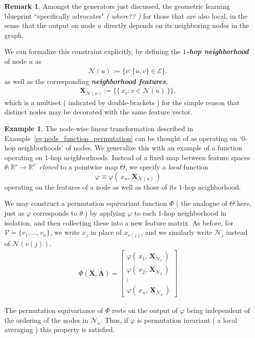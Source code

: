 \documentclass[12pt]{article}
\numberwithin{equation}{section}
\theoremstyle{definition}
\newtheorem{rmk}[thm]{Remark}
\newtheorem{eg}{Example}
\newcommand{		\eq		}[1]	{	\begin{align*}#1\end{align*}	}%
\newcommand{		\B		}	{\textbf					} %
\newcommand{		\1		}	{	\bm{1}					}%
\begin{document}
\begin{rmk}
Amongst the generators just discussed, the geometric learning blueprint ``specifically advocates" \emph{( where?? )} for those that are also local, in the sense that the output on node $u$ directly depends on its neighboring nodes in the graph. 
\end{rmk}

We can formalize this constraint explicitly, by defining the \emph{\B{$1$-hop neighborhood}} of node $u$ as
\eq{
\mathcal{N}(u) := \{ v : \{ u,v \} \in \mathcal{E} \} ,
}
as well as the corresponding \emph{\B{neighborhood features}}, 
\eq{
\bm{X}_{\mathcal{N}(u)} := \{ \{ \, x_v : v \in \mathcal{N}(u) \, \} \} ,
}
which is a multiset ( indicated by double-brackets ) for the simple reason that distinct nodes may be decorated with the same feature vector. 



\vspace{5mm}

\begin{mdframed}
\begin{eg}

The node-wise linear transformation described in Example~\ref{eg:node_function_permutation} can be thought of as operating on `$0$-hop neighborhoods' of nodes. We generalize this with an example of a function operating on $1$-hop neighborhoods. Instead of a fixed map between feature spaces $\theta : \mathbb{R}^s \to \mathbb{R}^{s'}$ \emph{cloned} to a pointwise map $\Theta$, we specify a \emph{local} function 
	$$
	\varphi \equiv \varphi( \, x_u, \, \bm{X}_{\mathcal{N}(u)} \, )
	$$ 
	operating on the features of a node as well as those of its $1$-hop neighborhood. 
	
We may construct a permutation equivariant function $\Phi$ ( the analogue of $\Theta$ here, just as $\varphi$ corresponds to $\theta$ ) by applying $\varphi$ to each $1$-hop neighborhood in isolation, and then collecting these into a new feature matrix. As before, for $\mathcal{V} = \{ v_1, \dots, v_n \}$, we write $x_j$ in place of $x_{v(j)}$, and we similarly write $\mathcal{N}_j$ instead of $\mathcal{N}( v(j) )$.
\eq{
\Phi ( \bm{X}, \bm{A} ) = 
\left[
\begin{matrix}
\varphi( \, x_1 , \, \bm{X}_{\mathcal{N}_1} \, ) \\
\varphi( \, x_2 , \, \bm{X}_{\mathcal{N}_2} \, ) \\
\vdots \\
\varphi( \, x_n , \, \bm{X}_{\mathcal{N}_n} \, )
\end{matrix}
\right]
}

The permutation equivariance of $\Phi$ rests on the output of $\varphi$ being independent of the ordering of the nodes in $\mathcal{N}_u$. Thus, if $\varphi$ is permutation invariant ( a local averaging ) this property is satisfied. 
\end{eg}
\end{mdframed}
\end{document}
